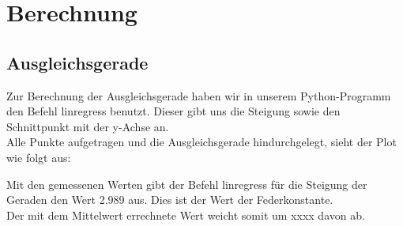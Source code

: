 \documentclass[captions=tableheading]{scrartcl}
\begin{document}
\section{Berechnung}
\subsection{Ausgleichsgerade}

Zur Berechnung der Ausgleichsgerade haben wir in unserem Python-Programm den Befehl linregress benutzt.
Dieser gibt uns die Steigung sowie den Schnittpunkt mit der y-Achse an.\\
Alle Punkte aufgetragen und die Ausgleichsgerade hindurchgelegt, sieht der Plot wie folgt aus:

\begin{figure}

\end{figure}

\newpage

Mit den gemessenen Werten gibt der Befehl linregress für die Steigung der Geraden den Wert 2.989 aus.
Dies ist der Wert der Federkonstante.\\
Der mit dem Mittelwert errechnete Wert weicht somit um xxxx davon ab.
\end{document}
